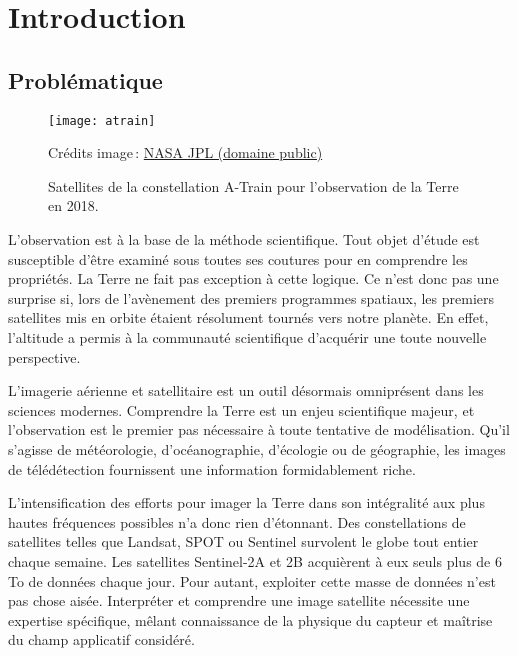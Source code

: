 \chapter{Introduction}
\label{chap:intro}
	\minitoc
	\newpage


\section{Problématique}

\begin{figure}[h]
	\texttt{[image: atrain]}
	\caption{Satellites de la constellation A-Train pour l'observation de la Terre en 2018.}
	{\small Crédits image\,: \href{https://commons.wikimedia.org/w/index.php?curid=33645603}{NASA JPL (domaine public)}}
	\label{fig:atrain}
\end{figure}

L'observation est à la base de la méthode scientifique. Tout objet d'étude est susceptible d'être examiné sous toutes ses coutures pour en comprendre les propriétés. La Terre ne fait pas exception à cette logique. Ce n'est donc pas une surprise si, lors de l'avènement des premiers programmes spatiaux, les premiers satellites mis en orbite étaient résolument tournés vers notre planète. En effet, l'altitude a permis à la communauté scientifique d'acquérir une toute nouvelle perspective.

L'imagerie aérienne et satellitaire est un outil désormais omniprésent dans les sciences modernes. Comprendre la Terre est un enjeu scientifique majeur, et l'observation est le premier pas nécessaire à toute tentative de modélisation. Qu'il s'agisse de météorologie, d'océanographie, d'écologie ou de géographie, les images de télédétection fournissent une information formidablement riche.

L'intensification des efforts pour imager la Terre dans son intégralité aux plus hautes fréquences possibles n'a donc rien d'étonnant. Des constellations de satellites telles que \gls{Landsat}, \gls{SPOT} ou \gls{Sentinel} survolent le globe tout entier chaque semaine. Les satellites Sentinel-2A et 2B acquièrent à eux seuls plus de 6 To de données chaque jour. Pour autant, exploiter cette masse de données n'est pas chose aisée. Interpréter et comprendre une image satellite nécessite une expertise spécifique, mêlant connaissance de la physique du capteur et maîtrise du champ applicatif considéré.

